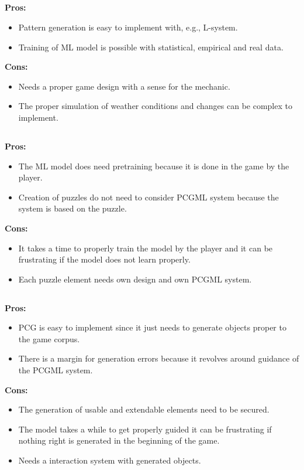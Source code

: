 \documentclass[MGS,Master,english]{twbook}%
\begin{document}
\subsection{}
\textbf{Pros:}
\begin{itemize}
	\item Pattern generation is easy to implement with, e.g., L-system.
	\item Training of ML model is possible with statistical, empirical and real data.
\end{itemize}
\textbf{Cons:}
\begin{itemize}
	\item Needs a proper game design with a sense for the mechanic.
	\item The proper simulation of weather conditions and changes can be complex to implement.
\end{itemize}

\subsection{}
\textbf{Pros:}
\begin{itemize}
	\item The ML model does need pretraining because it is done in the game by the player.
	\item Creation of puzzles do not need to consider PCGML system because the system is based on the puzzle.
\end{itemize}
\textbf{Cons:}
\begin{itemize}
	\item It takes a time to properly train the model by the player and it can be frustrating if the model does not learn properly.
	\item Each puzzle element needs own design and own PCGML system.
\end{itemize}

\subsection{}
\textbf{Pros:}
\begin{itemize}
	\item PCG is easy to implement since it just needs to generate objects proper to the game corpus.
	\item There is a margin for generation errors because it revolves around guidance of the PCGML system.
\end{itemize}
\textbf{Cons:}
\begin{itemize}
	\item The generation of usable and extendable elements need to be secured.
	\item The model takes a while to get properly guided it can be frustrating if nothing right is generated in the beginning of the game.
	\item Needs a interaction system with generated objects.
\end{itemize}
\end{document}
